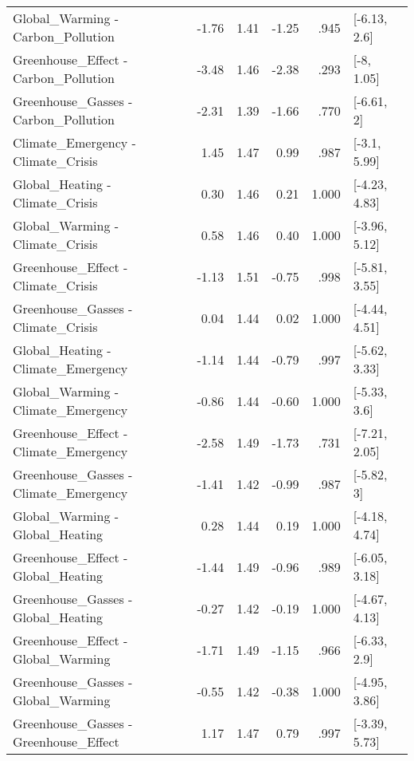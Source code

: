\begin{table}[ht]
\begin{tabular}{lrrrrl}
  Global\_Warming - Carbon\_Pollution & -1.76 & 1.41 & -1.25 & .945 & [-6.13, 2.6] \\ 
  Greenhouse\_Effect - Carbon\_Pollution & -3.48 & 1.46 & -2.38 & .293 & [-8, 1.05] \\ 
  Greenhouse\_Gasses - Carbon\_Pollution & -2.31 & 1.39 & -1.66 & .770 & [-6.61, 2] \\ 
  Climate\_Emergency - Climate\_Crisis & 1.45 & 1.47 & 0.99 & .987 & [-3.1, 5.99] \\ 
  Global\_Heating - Climate\_Crisis & 0.30 & 1.46 & 0.21 & 1.000 & [-4.23, 4.83] \\ 
  Global\_Warming - Climate\_Crisis & 0.58 & 1.46 & 0.40 & 1.000 & [-3.96, 5.12] \\ 
  Greenhouse\_Effect - Climate\_Crisis & -1.13 & 1.51 & -0.75 & .998 & [-5.81, 3.55] \\ 
  Greenhouse\_Gasses - Climate\_Crisis & 0.04 & 1.44 & 0.02 & 1.000 & [-4.44, 4.51] \\ 
  Global\_Heating - Climate\_Emergency & -1.14 & 1.44 & -0.79 & .997 & [-5.62, 3.33] \\ 
  Global\_Warming - Climate\_Emergency & -0.86 & 1.44 & -0.60 & 1.000 & [-5.33, 3.6] \\ 
  Greenhouse\_Effect - Climate\_Emergency & -2.58 & 1.49 & -1.73 & .731 & [-7.21, 2.05] \\ 
  Greenhouse\_Gasses - Climate\_Emergency & -1.41 & 1.42 & -0.99 & .987 & [-5.82, 3] \\ 
  Global\_Warming - Global\_Heating & 0.28 & 1.44 & 0.19 & 1.000 & [-4.18, 4.74] \\ 
  Greenhouse\_Effect - Global\_Heating & -1.44 & 1.49 & -0.96 & .989 & [-6.05, 3.18] \\ 
  Greenhouse\_Gasses - Global\_Heating & -0.27 & 1.42 & -0.19 & 1.000 & [-4.67, 4.13] \\ 
  Greenhouse\_Effect - Global\_Warming & -1.71 & 1.49 & -1.15 & .966 & [-6.33, 2.9] \\ 
  Greenhouse\_Gasses - Global\_Warming & -0.55 & 1.42 & -0.38 & 1.000 & [-4.95, 3.86] \\ 
  Greenhouse\_Gasses - Greenhouse\_Effect & 1.17 & 1.47 & 0.79 & .997 & [-3.39, 5.73] \\ 
   \hline
\end{tabular}
\end{table}
